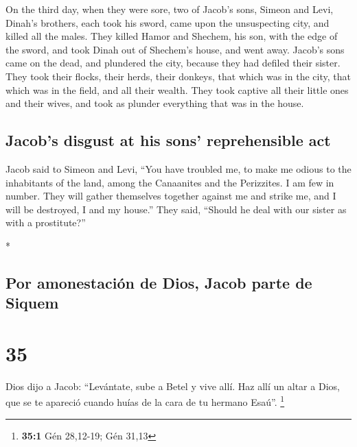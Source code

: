 \begin{paracol}{2}
\begin{otherlanguage}{english}
 On the third day, when they were sore, two of Jacob's
sons, Simeon and Levi, Dinah's brothers, each took his sword, came upon
the unsuspecting city, and killed all the males.  They
killed Hamor and Shechem, his son, with the edge of the sword, and took
Dinah out of Shechem's house, and went away.  Jacob's
sons came on the dead, and plundered the city, because they had defiled
their sister.  They took their flocks, their herds, their
donkeys, that which was in the city, that which was in the field,
 and all their wealth. They took captive all their little
ones and their wives, and took as plunder everything that was in the
house.

\hypertarget{jacobs-disgust-at-his-sons-reprehensible-act}{%
\subsection{Jacob's disgust at his sons' reprehensible
act}\label{jacobs-disgust-at-his-sons-reprehensible-act}}

 Jacob said to Simeon and Levi, ``You have troubled me,
to make me odious to the inhabitants of the land, among the Canaanites
and the Perizzites. I am few in number. They will gather themselves
together against me and strike me, and I will be destroyed, I and my
house.''  They said, ``Should he deal with our sister as
with a prostitute?''

\end{otherlanguage}

\switchcolumn[0]*

\hypertarget{por-amonestaciuxf3n-de-dios-jacob-parte-de-siquem}{%
\subsection{Por amonestación de Dios, Jacob parte de
Siquem}\label{por-amonestaciuxf3n-de-dios-jacob-parte-de-siquem}}

\hypertarget{section-68}{%
\section{35}\label{section-68}}

 Dios dijo a Jacob: ``Levántate, sube a Betel y vive allí.
Haz allí un altar a Dios, que se te apareció cuando huías de la cara de
tu hermano Esaú''. \footnote{\textbf{35:1} Gén 28,12-19; Gén 31,13}


\end{paracol}
